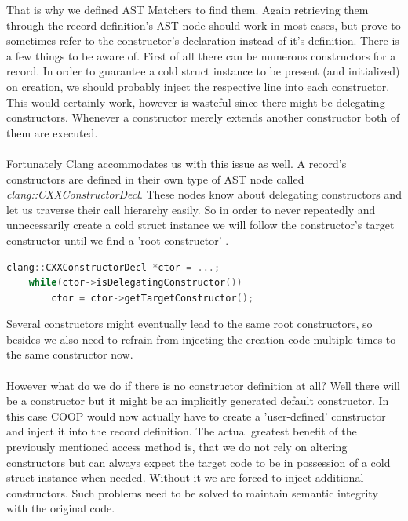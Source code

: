 That is why we defined AST Matchers to find them. Again retrieving them through the record definition's AST node should work in most cases, but prove to sometimes refer to the constructor's declaration instead of it's definition. There is a few things to be aware of. First of all there can be numerous constructors for a record. In order to guarantee a cold struct instance to be present (and initialized) on creation, we should probably inject the respective line into each constructor. This would certainly work, however is wasteful since there might be delegating constructors. Whenever a constructor merely extends another constructor both of them are executed.\\\\
Fortunately Clang accommodates us with this issue as well. A record's constructors are defined in their own type of AST node called \textit{clang::CXXConstructorDecl}. These nodes know about delegating constructors and let us traverse their call hierarchy easily. So in order to never repeatedly and unnecessarily create a cold struct instance we will follow the constructor's target constructor until we find a 'root constructor' .
\begin{lstlisting}[language=C++, name={Traversing the constructors' delegating constructors until we find a 'root' node.}, label={delegating_ctors}, morekeywords={clang, CXXConstructorDecl}]
	clang::CXXConstructorDecl *ctor = ...;
	while(ctor->isDelegatingConstructor())
		ctor = ctor->getTargetConstructor();
\end{lstlisting}
Several constructors might eventually lead to the same root constructors, so besides we also need to refrain from injecting the creation code multiple times to the same constructor now.\\\\
However what do we do if there is no constructor definition at all? Well there will be a constructor but it might be an implicitly generated default constructor. In this case COOP would now actually have to create a 'user-defined' constructor and inject it into the record definition. The actual greatest benefit of the previously mentioned access method is, that we do not rely on altering constructors but can always expect the target code to be in possession of a cold struct instance when needed. Without it we are forced to inject additional constructors. Such problems need to be solved to maintain semantic integrity with the original code.

